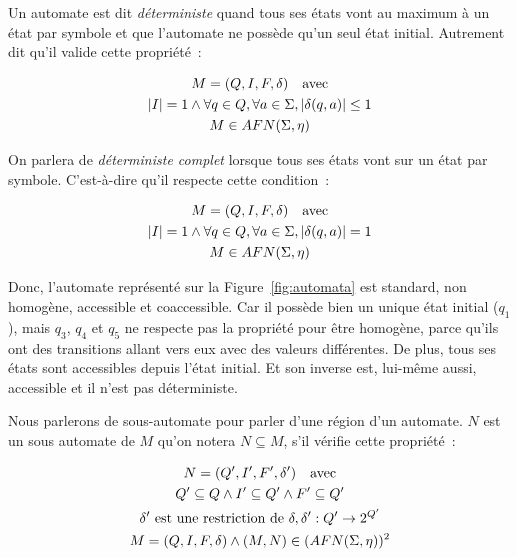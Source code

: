 \begin{definition}
    Un automate est dit \textit{déterministe} quand tous ses états vont au
    maximum à un état par symbole et que l'automate ne possède qu'un seul état
    initial. Autrement dit qu'il valide cette propriété~:

    \begin{gather*}
        M = (Q, I, F, \delta) \quad \text{avec} \\
        |I| = 1 \land \forall q \in Q, \forall a \in \Sigma, | \delta(q, a) | \leq 1\\
        M \in AFN(\Sigma, \eta) \notag
    \end{gather*}

    On parlera de \textit{déterministe complet} lorsque tous ses états vont sur
    un état par symbole. C'est-à-dire qu'il respecte cette condition~:

    \begin{gather*}
        M = (Q, I, F, \delta) \quad \text{avec} \\
        |I| = 1 \land \forall q \in Q, \forall a \in \Sigma, | \delta(q, a) | = 1\\
        M \in AFN(\Sigma, \eta) \notag
    \end{gather*}
\end{definition}

\begin{example}
    Donc, l'automate représenté sur la Figure~\ref{fig:automata} est standard,
    non homogène, accessible et coaccessible. Car il possède bien un unique
    état initial (\(q_1\)), mais \(q_3\), \(q_4\) et \(q_5\) ne respecte pas la
    propriété pour être homogène, parce qu'ils ont des transitions allant vers
    eux avec des valeurs différentes. De plus, tous ses états sont accessibles
    depuis l'état initial. Et son inverse est, lui-même aussi, accessible et il
    n'est pas déterministe.
\end{example}

\begin{definition}
    Nous parlerons de sous-automate pour parler d'une \og{}région\fg{} d'un
    automate. \(N\) est un sous automate de \(M\) qu'on notera \(N \subseteq
    M\), s'il vérifie cette propriété~:

    \begin{gather*}
        N = (Q', I', F', \delta') \quad \text{avec} \\
        Q' \subseteq Q \land I' \subseteq Q' \land F' \subseteq Q' \\
        \delta' \text{ est une restriction de } \delta, \delta': Q' \to 2^{Q'}\\
        M = (Q, I, F, \delta) \land (M, N) \in (AFN(\Sigma, \eta))^2 \notag
    \end{gather*}
\end{definition}

